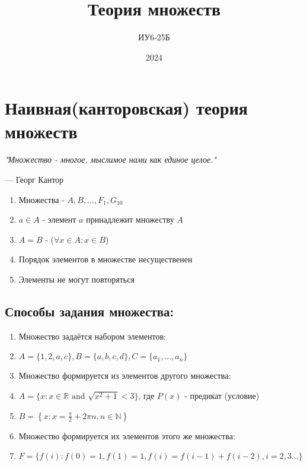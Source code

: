 \documentclass[10pt]{article}
\title{Теория множеств}
\author{ИУ6-25Б}
\date{2024}
\begin{document}
\maketitle

\section*{Наивная(канторовская) теория множеств}
\par\hfill\textit{"Множество - многое, мыслимое нами как единое целое."}
\par\hfill --- Георг Кантор
\par\begin{enumerate}
    \item Множества - $A, B, \dots, F_{1}, G_{10}$
    \item $a \in A$ - элемент $a$ принадлежит множеству $A$
    \item $A = B$ - ($\forall x \in A: x \in B$)
    \item Порядок элементов в множестве несущественен
    \item Элементы не могут повторяться
\end{enumerate}
\subsection*{Способы задания множества:}
\begin{enumerate}
    \item Множество задаётся набором элементов:
    \item[] $A = \{ 1, 2, a, c \}, B = \{ a, b, c, d \}, C = \{ a_{1}, \dots, a_{n} \}$
    \item Множество формируется из элементов другого множества:
    \item[] $A = \{ x: x \in \mathbb{R} \text{ and } \sqrt{x^2 + 1} < 3 \}$, где $P(x)$ - предикат (условие)
    \item[] $B = \left\{  x: x = \frac{\pi}{2} + 2\pi n, n \in \mathbb{N}  \right\}$
    \item Множество формируется их элементов этого же множества:
    \item[] $F = \{ f(i): f(0) = 1, f(1) = 1, f(i) = f(i - 1) + f(i - 2), i = 2, 3\dots \}$
\end{enumerate}
\end{document}
